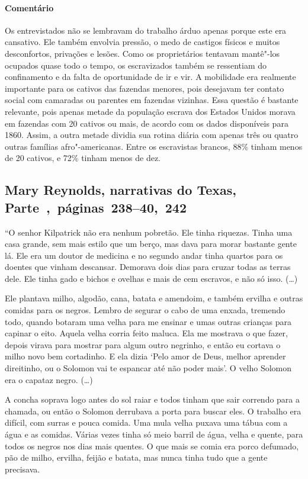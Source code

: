 \paragraph{Comentário}\quad
{\small
Os entrevistados não se lembravam do trabalho árduo apenas porque
este era cansativo. Ele também envolvia pressão, o medo de castigos
físicos e muitos desconfortos, privações e lesões. Como os proprietários
tentavam mantê"-los ocupados quase todo o tempo, os escravizados também se
ressentiam do confinamento e da falta de oportunidade de ir e vir. A
mobilidade era realmente importante para os cativos das fazendas
menores, pois desejavam ter contato social com camaradas ou
parentes em fazendas vizinhas. Essa questão é bastante relevante, pois
apenas metade da população escrava dos Estados Unidos morava em
fazendas com 20 cativos ou mais, de acordo com os dados disponíveis
para 1860. Assim, a outra metade dividia sua rotina diária com apenas
três ou quatro outras famílias afro"-americanas. Entre os escravistas
brancos, 88\% tinham menos de 20 cativos, e 72\% tinham menos de dez.
}


\subsection{Mary Reynolds, narrativas do Texas, Parte~,~páginas~238--40,~242}
\label{ref222}

``O senhor Kilpatrick não era nenhum pobretão. Ele tinha riquezas. Tinha
uma casa grande, sem mais estilo que um berço, mas dava para morar
bastante gente lá. Ele era um doutor de medicina e no segundo andar
tinha quartos para os doentes que vinham descansar. Demorava dois dias
para cruzar todas as terras dele. Ele tinha gado e bichos e ovelhas e
mais de cem escravos, e não só isso. (\ldots{})

Ele plantava milho, algodão, cana, batata e amendoim, e também ervilha e
outras comidas para os negros. Lembro de segurar o cabo de uma enxada,
tremendo todo, quando botaram uma velha para me ensinar e umas outras
crianças para capinar o eito. Aquela velha corria feito maluca. Ela me
mostrava o que fazer, depois virava para mostrar para algum outro
negrinho, e então eu cortava o milho novo bem cortadinho. E ela dizia
`Pelo amor de Deus, melhor aprender direitinho, ou o Solomon vai te
espancar até não poder mais'. O velho Solomon era o capataz negro.
(\ldots{})

A concha soprava logo antes do sol raiar e todos tinham que sair
correndo para a chamada, ou então o Solomon derrubava a porta para
buscar eles. O trabalho era difícil, com surras e pouca comida. Uma mula
velha puxava uma tábua com a água e as comidas. Várias vezes tinha só
meio barril de água, velha e quente, para todos os negros nos dias mais
quentes. O que mais se comia era porco defumado, pão de milho, ervilha,
feijão e batata, mas nunca tinha tudo que a gente precisava.

